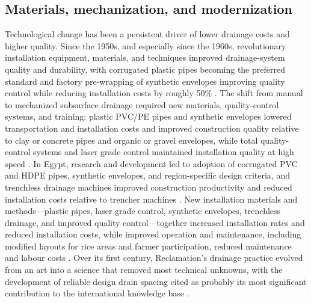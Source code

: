 \documentclass[11pt]{article}
\begin{document}
\subsection{Materials, mechanization, and modernization}
Technological change has been a persistent driver of lower drainage costs and higher quality. Since the 1950s, and especially since the 1960s, revolutionary installation equipment, materials, and techniques improved drainage-system quality and durability, with corrugated plastic pipes becoming the preferred standard and factory pre-wrapping of synthetic envelopes improving quality control while reducing installation costs by roughly 50\% \parencite{Yannopoulos2020}. The shift from manual to mechanized subsurface drainage required new materials, quality-control systems, and training: plastic PVC/PE pipes and synthetic envelopes lowered transportation and installation costs and improved construction quality relative to clay or concrete pipes and organic or gravel envelopes, while total quality-control systems and laser grade control maintained installation quality at high speed \parencite{Ritzema2006}. In Egypt, research and development led to adoption of corrugated PVC and HDPE pipes, synthetic envelopes, and region-specific design criteria, and trenchless drainage machines improved construction productivity and reduced installation costs relative to trencher machines \parencite{AbdelDayem2007}. New installation materials and methods---plastic pipes, laser grade control, synthetic envelopes, trenchless drainage, and improved quality control---together increased installation rates and reduced installation costs, while improved operation and maintenance, including modified layouts for rice areas and farmer participation, reduced maintenance and labour costs \parencite{Ritzema2007}. Over its first century, Reclamation's drainage practice evolved from an art into a science that removed most technical unknowns, with the development of reliable design drain spacing cited as probably its most significant contribution to the international knowledge base \parencite{TeKrony2004}.
\end{document}
